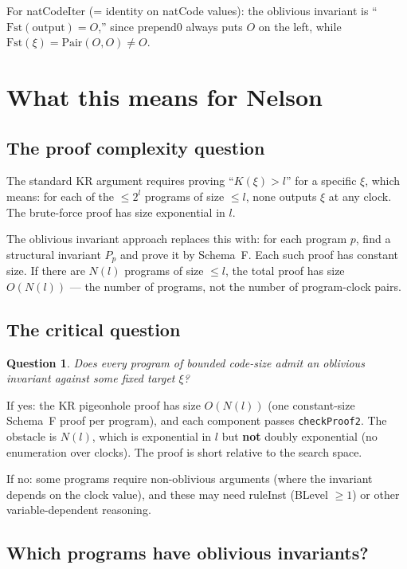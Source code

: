 \documentclass[11pt]{article}
\newtheorem{question}[theorem]{Question}
\begin{document}
For natCodeIter (= identity on natCode values): the oblivious invariant is ``$\mathrm{Fst}(\text{output}) = O$,'' since $\mathrm{prepend0}$ always puts $O$ on the left, while $\mathrm{Fst}(\xi) = \mathrm{Pair}(O,O) \ne O$.

\section{What this means for Nelson}

\subsection{The proof complexity question}

The standard KR argument requires proving ``$K(\xi) > l$'' for a specific $\xi$, which means: for each of the $\le 2^l$ programs of size $\le l$, none outputs $\xi$ at any clock. The brute-force proof has size exponential in $l$.

The oblivious invariant approach replaces this with: for each program $p$, find a structural invariant $P_p$ and prove it by Schema~F. Each such proof has constant size. If there are $N(l)$ programs of size $\le l$, the total proof has size $O(N(l))$ --- the number of programs, not the number of program-clock pairs.

\subsection{The critical question}

\begin{question}
Does every program of bounded code-size admit an oblivious invariant against some fixed target $\xi$?
\end{question}

If yes: the KR pigeonhole proof has size $O(N(l))$ (one constant-size Schema~F proof per program), and each component passes \texttt{checkProof2}. The obstacle is $N(l)$, which is exponential in $l$ but \textbf{not} doubly exponential (no enumeration over clocks). The proof is short relative to the search space.

If no: some programs require non-oblivious arguments (where the invariant depends on the clock value), and these may need ruleInst (BLevel $\ge 1$) or other variable-dependent reasoning.

\subsection{Which programs have oblivious invariants?}
\end{document}
